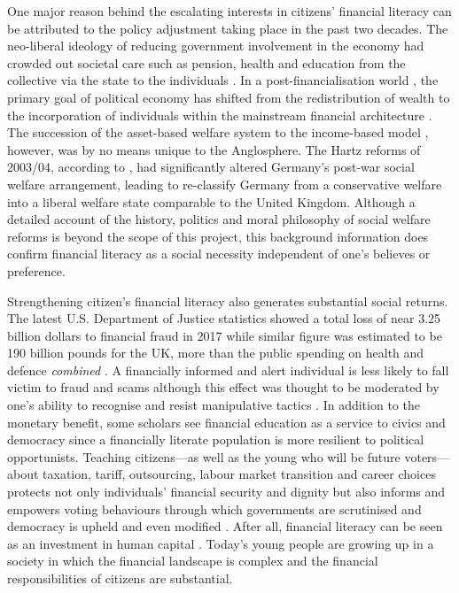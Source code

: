 \documentclass[a4paper,11pt,UKenglish,twoside,openright]{report}\usepackage[]{graphicx}\usepackage[]{color}
\begin{document}
One major reason behind the escalating interests in citizens' financial literacy can be attributed to the policy adjustment taking place in the past two decades. The neo-liberal ideology of reducing government involvement in the economy had crowded out societal care such as pension, health and education from the collective via the state to the individuals \parencite{gilbert:2002}. In a post-financialisation world \parencite{krippner:2005}, the primary goal of political economy has shifted from the redistribution of wealth to the incorporation of individuals within the mainstream financial architecture \parencite{regan:2003}. The succession of the asset-based welfare system to the income-based model \parencite{finlayson:2009}, however, was by no means unique to the Anglosphere. The Hartz reforms of 2003/04, according to \textcite{seeleibkaiser:2016}, had significantly altered Germany's post-war social welfare arrangement, leading \textcite{ferragina:2015} to re-classify Germany from a conservative welfare into a liberal welfare state comparable to the United Kingdom. Although a detailed account of the history, politics and moral philosophy of social welfare reforms is beyond the scope of this project, this background information does confirm financial literacy as a social necessity independent of one's believes or preference.

Strengthening citizen's financial literacy also generates substantial social returns. The latest U.S. Department of Justice statistics showed a total loss of near 3.25 billion dollars to financial fraud in 2017 \parencite{doj:2021} while similar figure was estimated to be 190 billion pounds for the UK, more than the public spending on health and defence \emph{combined} \parencite{afi:2018}. A financially informed and alert individual is less likely to fall victim to fraud and scams \parencite{gamble:2015, lusardi:2012b} although this effect was thought to be moderated by one's ability to recognise and resist manipulative tactics \parencite{drew:2016}. In addition to the monetary benefit, some scholars see financial education as a service to civics and democracy since a financially literate population is more resilient to political opportunists. Teaching citizens---as well as the young who will be future voters---about taxation, tariff, outsourcing, labour market transition and career choices protects not only individuals' financial security and dignity but also informs and empowers voting behaviours through which governments are scrutinised and democracy is upheld \parencite{davies:2015} and even modified \parencite{arthur:2016}. After all, financial literacy can be seen as an investment in human capital \parencite{lusardi:2014}. Today's young people are growing up in a society in which the financial landscape is complex and the financial responsibilities of citizens are substantial.
\end{document}

